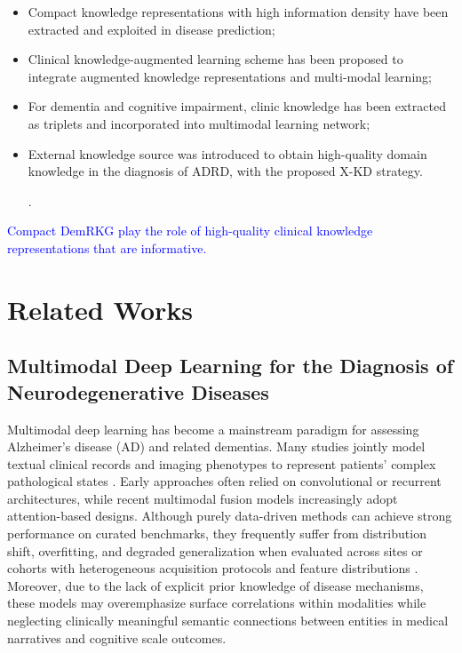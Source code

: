 \documentclass[lettersize,journal]{IEEEtran}
\begin{document}
\begin{itemize}
    \item Compact knowledge representations with high information density have been extracted and exploited in disease prediction;
    \item Clinical knowledge-augmented learning scheme has been proposed to integrate augmented knowledge representations and multi-modal learning;
    \item  For dementia and cognitive impairment, clinic knowledge has been extracted as triplets and incorporated into multimodal learning network;
    \item External knowledge source was introduced to obtain high-quality domain knowledge in the diagnosis of ADRD, with the proposed X-KD strategy.
    
    \cite{yang2015embedding}.
\end{itemize}

    \textcolor{blue}{Compact DemRKG play the role of high-quality clinical knowledge representations that are informative.}



\section{Related Works}

\subsection{Multimodal Deep Learning for the Diagnosis of Neurodegenerative Diseases}

Multimodal deep learning has become a mainstream paradigm for assessing Alzheimer's disease (AD) and related dementias. Many studies jointly model textual clinical records and imaging phenotypes to represent patients' complex pathological states \cite{jin2026multimodal}. Early approaches often relied on convolutional or recurrent architectures, while recent multimodal fusion models increasingly adopt attention-based designs. Although purely data-driven methods can achieve strong performance on curated benchmarks, they frequently suffer from distribution shift, overfitting, and degraded generalization when evaluated across sites or cohorts with heterogeneous acquisition protocols and feature distributions \cite{abugabah2025intelligent}. Moreover, due to the lack of explicit prior knowledge of disease mechanisms, these models may overemphasize surface correlations within modalities while neglecting clinically meaningful semantic connections between entities in medical narratives and cognitive scale outcomes.
\end{document}
